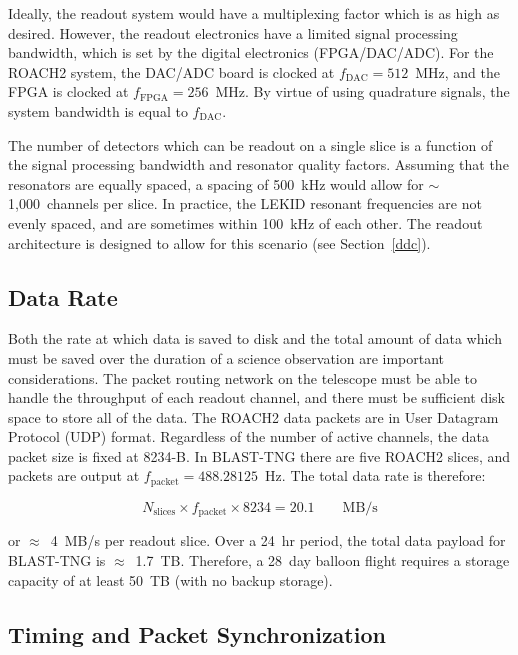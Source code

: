 Ideally, the readout system would have a multiplexing factor which is as high as desired. However, the readout electronics have a limited signal processing bandwidth, which is set by the digital electronics (FPGA/DAC/ADC). For the ROACH2 system, the DAC/ADC board is clocked at $f_{\mathrm{DAC}} = 512$~MHz, and the FPGA is clocked at $f_{\mathrm{FPGA}} = 256$~MHz. By virtue of using quadrature signals, the system bandwidth is equal to $f_{\mathrm{DAC}}$.

The number of detectors which can be readout on a single slice is a function of the signal processing bandwidth and resonator quality factors. Assuming that the resonators are equally spaced, a spacing of 500~kHz would allow for $\sim$1,000~channels per slice. In practice, the LEKID resonant frequencies are not evenly spaced, and are sometimes within 100~kHz of each other. The readout architecture is designed to allow for this scenario (see Section~\ref{ddc}).

\subsection{Data Rate}\label{data rate}

Both the rate at which data is saved to disk and the total amount of data which must be saved over the duration of a science observation are important considerations. The packet routing network on the telescope must be able to handle the throughput of each readout channel, and there must be sufficient disk space to store all of the data. The ROACH2 data packets are in User Datagram Protocol (UDP) format. Regardless of the number of active channels, the data packet size is fixed at 8234-B. In BLAST-TNG there are five ROACH2 slices, and packets are output at $f_{\mathrm{packet}} = 488.28125$~Hz. The total data rate is therefore:

\begin{equation}\label{eq:data rate}
  N_{\mathrm{slices}} \times f_{\mathrm{packet}} \times 8234 =  20.1 \qquad \mathrm{MB/s}
\end{equation}

or $\approx$~4~MB/s per readout slice. Over a 24~hr period, the total data payload for BLAST-TNG is $\approx$~1.7~TB\@. Therefore, a 28~day balloon flight requires a storage capacity of at least 50~TB (with no backup storage).

\subsection{Timing and Packet Synchronization}\label{timing}

